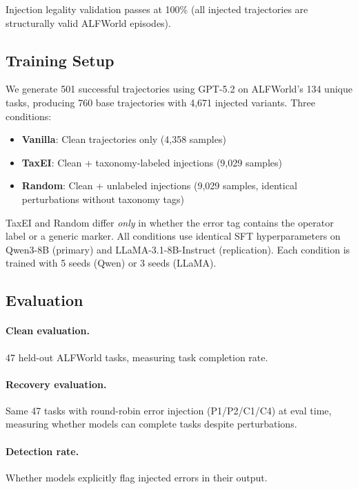 \documentclass[11pt,a4paper]{article}
\begin{document}
Injection legality validation passes at 100\% (all injected trajectories are structurally valid ALFWorld episodes).

\subsection{Training Setup}

We generate 501 successful trajectories using GPT-5.2 on ALFWorld's 134 unique tasks, producing 760 base trajectories with 4,671 injected variants. Three conditions:

\begin{itemize}
    \item \textbf{Vanilla}: Clean trajectories only (4,358 samples)
    \item \textbf{TaxEI}: Clean + taxonomy-labeled injections (9,029 samples)
    \item \textbf{Random}: Clean + unlabeled injections (9,029 samples, identical perturbations without taxonomy tags)
\end{itemize}

TaxEI and Random differ \emph{only} in whether the error tag contains the operator label or a generic marker. All conditions use identical SFT hyperparameters on Qwen3-8B (primary) and LLaMA-3.1-8B-Instruct (replication). Each condition is trained with 5 seeds (Qwen) or 3 seeds (LLaMA).

\subsection{Evaluation}

\paragraph{Clean evaluation.} 47 held-out ALFWorld tasks, measuring task completion rate.
\paragraph{Recovery evaluation.} Same 47 tasks with round-robin error injection (P1/P2/C1/C4) at eval time, measuring whether models can complete tasks despite perturbations.
\paragraph{Detection rate.} Whether models explicitly flag injected errors in their output.

\end{document}
